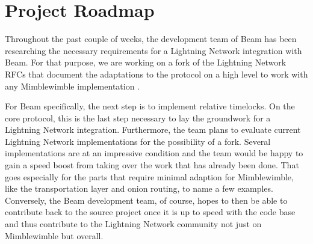\documentclass[letterpaper]{article}
\begin{document}
\section{Project Roadmap}
Throughout the past couple of weeks, the development team of Beam has been researching the necessary requirements for a Lightning Network integration with Beam. For that purpose, we are working on a fork of the Lightning Network RFCs that document the adaptations to the protocol on a high level to work with any Mimblewimble implementation \cite{lmw}.

For Beam specifically, the next step is to implement relative timelocks. On the core protocol, this is the last step necessary to lay the groundwork for a Lightning Network integration. Furthermore, the team plans to evaluate current Lightning Network implementations for the possibility of a fork. Several implementations are at an impressive condition and the team would be happy to gain a speed boost from taking over the work that has already been done. That goes especially for the parts that require minimal adaption for Mimblewimble, like the transportation layer and onion routing, to name a few examples. Conversely, the Beam development team, of course, hopes to then be able to contribute back to the source project once it is up to speed with the code base and thus contribute to the Lightning Network community not just on Mimblewimble but overall.

\printbibliography
\end{document}

